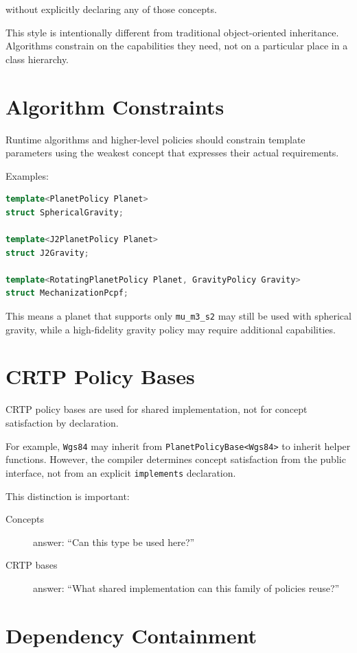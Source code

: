 \documentclass[11pt]{article}
\begin{document}
without explicitly declaring any of those concepts.

This style is intentionally different from traditional object-oriented
inheritance. Algorithms constrain on the capabilities they need, not on a
particular place in a class hierarchy.

\section{Algorithm Constraints}

Runtime algorithms and higher-level policies should constrain template
parameters using the weakest concept that expresses their actual requirements.

Examples:

\begin{lstlisting}[language=C++]
template<PlanetPolicy Planet>
struct SphericalGravity;

template<J2PlanetPolicy Planet>
struct J2Gravity;

template<RotatingPlanetPolicy Planet, GravityPolicy Gravity>
struct MechanizationPcpf;
\end{lstlisting}

This means a planet that supports only \texttt{mu\_m3\_s2} may still be used
with spherical gravity, while a high-fidelity gravity policy may require
additional capabilities.

\section{CRTP Policy Bases}

CRTP policy bases are used for shared implementation, not for concept
satisfaction by declaration.

For example, \texttt{Wgs84} may inherit from
\texttt{PlanetPolicyBase<Wgs84>} to inherit helper functions. However, the
compiler determines concept satisfaction from the public interface, not from an
explicit \texttt{implements} declaration.

This distinction is important:

\begin{description}
    \item[Concepts] answer: ``Can this type be used here?''
    \item[CRTP bases] answer: ``What shared implementation can this family of
    policies reuse?''
\end{description}

\section{Dependency Containment}
\end{document}
